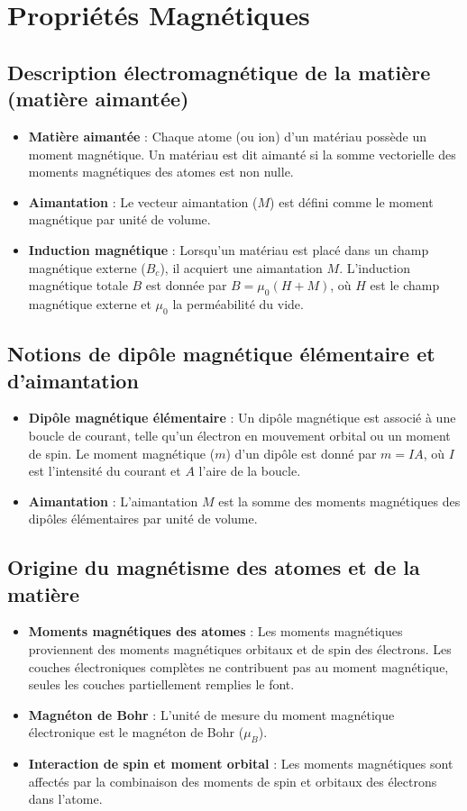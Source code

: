 \documentclass{article}
\begin{document}
\section{Propriétés Magnétiques}
    \subsection{Description électromagnétique de la matière (matière aimantée)}
    \begin{itemize}
        \item \textbf{Matière aimantée} : Chaque atome (ou ion) d'un matériau possède un moment magnétique. Un matériau est dit aimanté si la somme vectorielle des moments magnétiques des atomes est non nulle.
        \item \textbf{Aimantation} : Le vecteur aimantation (\(M\)) est défini comme le moment magnétique par unité de volume. 
        \item \textbf{Induction magnétique} : Lorsqu'un matériau est placé dans un champ magnétique externe (\(B_c\)), il acquiert une aimantation \(M\). L'induction magnétique totale \(B\) est donnée par \(B = \mu_0 (H + M)\), où \(H\) est le champ magnétique externe et \(\mu_0\) la perméabilité du vide.
    \end{itemize}
    
    \subsection{Notions de dipôle magnétique élémentaire et d’aimantation}
    \begin{itemize}
        \item \textbf{Dipôle magnétique élémentaire} : Un dipôle magnétique est associé à une boucle de courant, telle qu'un électron en mouvement orbital ou un moment de spin. Le moment magnétique (\(m\)) d'un dipôle est donné par \(m = I A\), où \(I\) est l'intensité du courant et \(A\) l'aire de la boucle.
        \item \textbf{Aimantation} : L'aimantation \(M\) est la somme des moments magnétiques des dipôles élémentaires par unité de volume.
    \end{itemize}
    
    \subsection{Origine du magnétisme des atomes et de la matière}
    \begin{itemize}
        \item \textbf{Moments magnétiques des atomes} : Les moments magnétiques proviennent des moments magnétiques orbitaux et de spin des électrons. Les couches électroniques complètes ne contribuent pas au moment magnétique, seules les couches partiellement remplies le font.
        \item \textbf{Magnéton de Bohr} : L'unité de mesure du moment magnétique électronique est le magnéton de Bohr (\(\mu_B\)).
        \item \textbf{Interaction de spin et moment orbital} : Les moments magnétiques sont affectés par la combinaison des moments de spin et orbitaux des électrons dans l'atome.
    \end{itemize}
    
\end{document}
